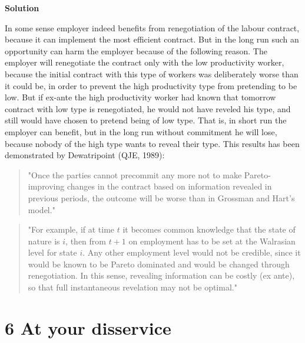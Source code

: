 \documentclass[a4paper]{article}
\begin{document}
		\textbf{Solution}
		
		In some sense employer indeed benefits from renegotiation of the labour contract, because it can implement the most efficient contract. But in the long run such an opportunity can harm the employer because of the following reason. The employer will renegotiate the contract only with the low productivity worker, because the initial contract with this type of workers was deliberately worse than it could be, in order to prevent the high productivity type from pretending to be low. But if ex-ante the high productivity worker had known that tomorrow contract with low type is renegotiated, he would not have reveled his type, and still would have chosen to pretend being of low type. That is, in short run the employer can benefit, but in the long run without commitment he will lose, because nobody of the high type wants to reveal their type. This results has been demonstrated by Dewatripoint (QJE, 1989):
		\begin{quote}
			"Once the parties cannot precommit any more not to make
			Pareto-improving changes in the contract based on information
			revealed in previous periods, the outcome will be worse than in
			Grossman and Hart's model."
		\end{quote}
	\begin{quote}
		"For example, if at time $t$ it becomes common
		knowledge that the state of nature is $i$, then from $t + 1$ on
		employment has to be set at the Walrasian level for state $i$. Any
		other employment level would not be credible, since it would be
		known to be Pareto dominated and would be changed through
		renegotiation. In this sense, revealing information can be costly (ex
		ante), so that full instantaneous revelation may not be optimal."
	\end{quote}
		
		\section*{6 At your disservice}
		
\end{document}
